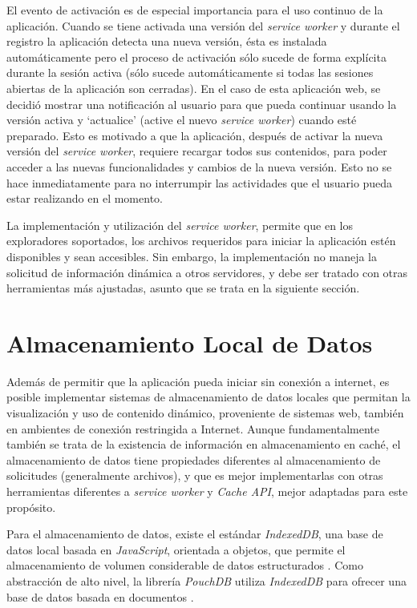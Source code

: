El evento de activación es de especial importancia para el uso continuo de la aplicación. Cuando se tiene activada una versión del \textit{service worker} y durante el registro la aplicación detecta una nueva versión, ésta es instalada automáticamente pero el proceso de activación sólo sucede de forma explícita durante la sesión activa (sólo sucede automáticamente si todas las sesiones abiertas de la aplicación son cerradas). En el caso de esta aplicación web, se decidió mostrar una notificación al usuario para que pueda continuar usando la versión activa y ‘actualice’ (active el nuevo \textit{service worker}) cuando esté preparado. Esto es motivado a que la aplicación, después de activar la nueva versión del \textit{service worker}, requiere recargar todos sus contenidos, para poder acceder a las nuevas funcionalidades y cambios de la nueva versión. Esto no se hace inmediatamente para no interrumpir las actividades que el usuario pueda estar realizando en el momento.

La implementación y utilización del \textit{service worker}, permite que en los exploradores soportados, los archivos requeridos para iniciar la aplicación estén disponibles y sean accesibles. Sin embargo, la implementación no maneja la solicitud de información dinámica a otros servidores, y debe ser tratado con otras herramientas más ajustadas, asunto que se trata en la siguiente sección.

\section{Almacenamiento Local de Datos}

Además de permitir que la aplicación pueda iniciar sin conexión a internet, es posible implementar sistemas de almacenamiento de datos locales que permitan la visualización y uso de contenido dinámico, proveniente de sistemas web, también en ambientes de conexión restringida a Internet. Aunque fundamentalmente también se trata de la existencia de información en almacenamiento en caché, el almacenamiento de datos tiene propiedades diferentes al almacenamiento de solicitudes (generalmente archivos), y que es mejor implementarlas con otras herramientas diferentes a \textit{service worker} y \textit{Cache API}, mejor adaptadas para este propósito.

Para el almacenamiento de datos, existe el estándar \textit{IndexedDB}, una base de datos local basada en \textit{JavaScript}, orientada a objetos, que permite el almacenamiento de volumen considerable de datos estructurados \cite{indexeddb}. Como abstracción de alto nivel, la librería \textit{PouchDB} utiliza \textit{IndexedDB} para ofrecer una base de datos basada en documentos \cite{pouchdb}.

